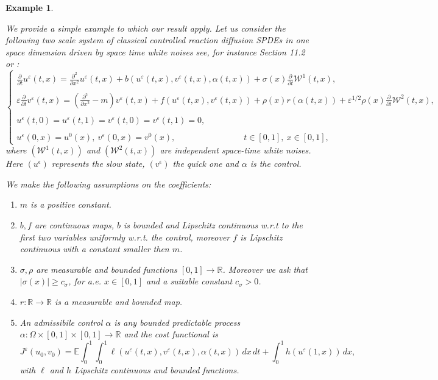 \documentclass[reqno,a4paper,11 pt]{article}
\def \E {\mathbb{E}}
\def \e {\varepsilon}
\def \R {\mathbb{R}}
\newtheorem{example}[theorem]{Example}
\numberwithin{equation}{section}
\begin{document}
\begin{example}\label{esempio}{\rm 
We provide a simple example
 to which our result apply.
Let us consider the following two scale system of classical controlled reaction diffusion  SPDEs in one space dimension driven by space time white noises see, for instance \cite{daza2} Section 11.2 or :
\begin{equation}\label{sistemaesempio}\left\{\begin{array}{l}
\displaystyle\frac{\partial}{\partial t} u^\e(t,x) = \frac{\partial^2}{\partial x^2} u^\e(t,x) +
 b(u^\e(t,x),v^\e(t,x), \alpha(t,x)) +
 \sigma(x)  \frac{\partial}{\partial t} {\mathcal{W}}^1(t,x),   \\ \\\displaystyle
\e\frac{\partial}{\partial t} v^\e(t,x)\! =\!(\frac{\partial^2}{\partial x^2}- m) v^\e(t,x)\! + \!
f(u^\e(t,x),v^\e(t,x))+  \rho(x) r(\alpha(t,x)) + 
 \e ^{1/2}\rho(x) \frac{\partial}{\partial t}
{\mathcal{W}}^2(t,x),   \\ \\
u^\e(t,0)=u^\e(t,1)=v^\e(t,0)=v^\e(t,1)=0, \,\\ \\
u^\e(0,x)= u^0(x), \ v^\e(0,x)= v^0(x),\qquad\qquad\qquad\qquad  t \in [0,1], \ x \in [0,1],
\end{array}\right.
\end{equation}
where $({\mathcal{W}}^1(t,x))$ and
 $({\mathcal{W}}^2(t,x))$  are independent
space-time white noises.  Here $(u^{\epsilon})$ represents the slow state, $(v^{\epsilon})$ the quick one and $\alpha$ is the control.

We make the following assumptions on the coefficients:
\begin{enumerate}
\item  $m$ is a positive constant.
\item  $b, f$ are  continuous maps, $b$ is bounded and Lipschitz continuous w.r.t to the first two variables uniformly w.r.t. the control, moreover
$f$  is  Lipschitz  continuous with a constant  smaller then $m$. 
\item $\sigma, \rho$ are measurable and bounded functions $ [0,1] \to \R$. Moreover we ask that $|\sigma (x)| \geq c_\sigma $, for a.e. $x \in [0,1]$ and a suitable constant $c_\sigma>0$.
\item  $r:  \R \to \R$ is a measurable and bounded map.
\item An admissibile control $\alpha$ is any bounded predictable  process $\alpha: \Omega \times [0,1] \times [0,1] \to \R$ and the cost functional is
\[ J^\e(u_0,v_0)= \E \int_0^1   \int_0^1  \ell (u^\e (t,x),v^\e (t,x), \alpha(t,x) ) \, dx \, dt + \int_0^1 h(u^\e (1,x)) \, dx,\]
with $\ell$ and $h$ Lipschitz continuous and bounded functions.
\end{enumerate}


}
\end{example}
\end{document}
